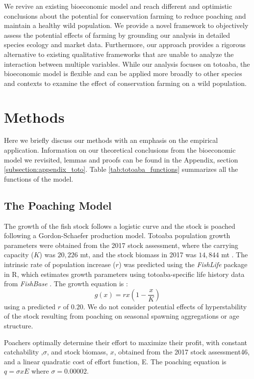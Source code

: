 We revive an existing bioeconomic model and reach different and optimistic conclusions about the potential for conservation farming to reduce poaching and maintain a healthy wild population. We provide a novel framework to objectively assess the potential effects of farming by grounding our analysis in detailed species ecology and market data. Furthermore, our approach provides a rigorous alternative to existing qualitative frameworks that are unable to analyze the interaction between multiple variables. While our analysis focuses on totoaba, the bioeconomic model is flexible and can be applied more broadly to other species and contexts to examine the effect of conservation farming on a wild population. 


\section{Methods}
Here we briefly discuss our methods with an emphasis on the empirical application. Information on our theoretical conclusions from the bioeconomic model we revisited, lemmas and proofs can be found in the Appendix, section \ref{subsection:appendix_toto}. Table \ref{tab:totoaba_functions} summarizes all the functions of the model.  

\subsection{The Poaching Model}

The growth of the fish stock follows a logistic curve and the stock is poached following a Gordon-Schaefer production model. Totoaba population growth parameters were obtained from the 2017 stock assessment, where the carrying capacity ($K$) was $20,226$ mt, and the stock biomass in 2017 was $14,844$ mt \citep{cisneros-mata_evaluacion_2020}. The intrinsic rate of population increase ($r$) was predicted using the \textit{FishLife} package in \textsf{R}, which estimates growth parameters using totoaba-specific life history data from \textit{FishBase} \citep{thorson_predicting_2017}. The growth equation is :
\begin{equation}
g(x) = rx\left(1-\frac{x}{K}\right)
\end{equation}
using a predicted $r$ of $0.20$. We do not consider potential effects of hyperstability of the stock resulting from poaching on seasonal spawning aggregations \citep{erisman_illusion_2011} or age structure.

Poachers optimally determine their effort to maximize their profit, with constant catchability ,$\sigma$, and stock biomass, $x$, obtained from the 2017 stock assessment46, and a linear quadratic cost of effort function, E. The poaching equation is $q =\sigma xE$ where $\sigma =  0.00002. $

